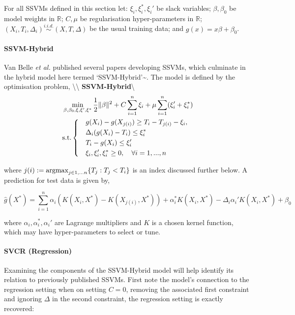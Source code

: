 \documentclass[
  letterpaper,
]{scrbook}
\let\oldparagraph\paragraph
\renewcommand{\paragraph}[1]{\oldparagraph{#1}\mbox{}}
\theoremstyle{plain}
\theoremstyle{definition}
\theoremstyle{remark}
\begin{document}
For all SSVMs defined in this section let: \(\xi_i,\xi_i^*,\xi_i'\) be
slack variables; \(\beta,\beta_0\) be model weights in \(\mathbb{R}\);
\(C, \mu\) be regularisation hyper-parameters in \(\mathbb{R}\);
\((X_i, T_i, \Delta_i) \stackrel{i.i.d.}\sim(X,T,\Delta)\) be the usual
training data; and \(g(x) = x\beta + \beta_0\).

\paragraph{SSVM-Hybrid}\label{mod:ssvmhybrid}

Van Belle \textit{et al.} published several papers developing SSVMs,
which culminate in the hybrid model here termed
`SSVM-Hybrid'\textasciitilde{}\cite{VanBelle2011b}. The model is defined
by the optimisation problem, \textbackslash\textbackslash{}
\textbf{SSVM-Hybrid}\textbackslash{} \[
\begin{aligned}
& \min_{\beta, \beta_0, \xi, \xi', \xi^*} \frac{1}{2}\|\beta\|^2 + C\sum_{i =1}^n \xi_i + \mu \sum^n_{i=1}(\xi_i' + \xi_i^*) \\
& \textrm{s.t.}
\begin{dcases}
& g(X_i) - g(X_{j(i)}) \geq T_i - T_{j(i)} - \xi_i, \\
& \Delta_i(g(X_i) - T_i) \leq \xi^*_i \\
& T_i - g(X_i) \leq \xi'_i \\
& \xi_i, \xi_i', \xi_i^* \geq 0, \quad \forall i = 1,...,n \\
\end{dcases}
\end{aligned}
\label{eq:surv_ssvmvb2}
\]

where
\(j(i) := \operatornamewithlimits{argmax}_{j \in 1,...n} \{T_j : T_j < T_i\}\)
is an index discussed further below. A prediction for test data is given
by,

\[
\hat{g}(X^*) = \sum^n_{i=1} \alpha_i(K(X_i, X^*) - K(X_{j(i)}, X^*)) + \alpha^*_i K(X_i, X^*) - \Delta_i\alpha_i'K(X_i, X^*) + \beta_0
\]

where \(\alpha_i, \alpha_i^*, \alpha_i'\) are Lagrange multipliers and
\(K\) is a chosen kernel function, which may have hyper-parameters to
select or tune.

\paragraph{SVCR (Regression)}

Examining the components of the SSVM-Hybrid model will help identify its
relation to previously published SSVMs. First note the model's
connection to the regression setting when on setting \(C = 0\), removing
the associated first constraint and ignoring \(\Delta\) in the second
constraint, the regression setting is exactly recovered:
\end{document}
